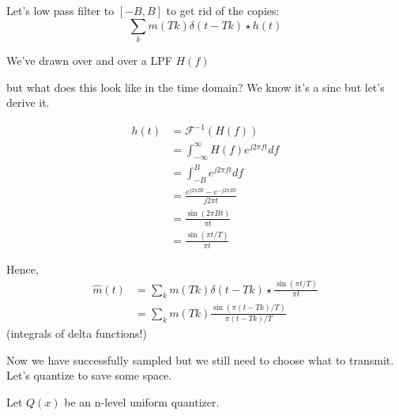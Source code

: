 \documentclass[12pt]{report}
\renewcommand{\hat}[1]{\widehat{#1}}
\newcommand{\F}{\mathcal{F}}
\begin{document}
Let's low pass filter to $[-B, B]$ to get rid of the copies: 
\[\sum_k m(Tk) \delta(t - Tk) \star h(t)\]

We've drawn over and over a LPF $H(f)$ 
\begin{center}
\end{center}

but what does this look like in the time domain? We know it's a sinc but let's derive it.

\begin{align*}
    h(t) &= \F^{-1}(H(f))\\ 
    &= \int_{-\infty}^{\infty} H(f) e^{j 2\pi ft} df\\ 
    &= \int_{-B}^{B} e^{j 2\pi ft} df\\ 
    &= \frac{e^{j 2\pi Bt} - e^{-j 2\pi Bt}}{j 2\pi t}\\ 
    &= \frac{\sin(2\pi Bt)}{\pi t}\\ 
    &= \frac{\sin(\pi t / T)}{\pi t}
\end{align*}

Hence, 
\begin{align*}
    \hat m(t) &= \sum_k m(Tk) \delta(t - Tk) \star \frac{\sin(\pi t / T)}{\pi t} \\ 
    &= \sum_k m(Tk) \frac{\sin(\pi (t - Tk) / T)}{\pi (t - Tk) / T}
\end{align*}
(integrals of delta functions!)

Now we have successfully sampled but we still need to choose what to transmit. Let's quantize to save some space. 

Let $Q(x)$ be an n-level uniform quantizer.
\end{document}
